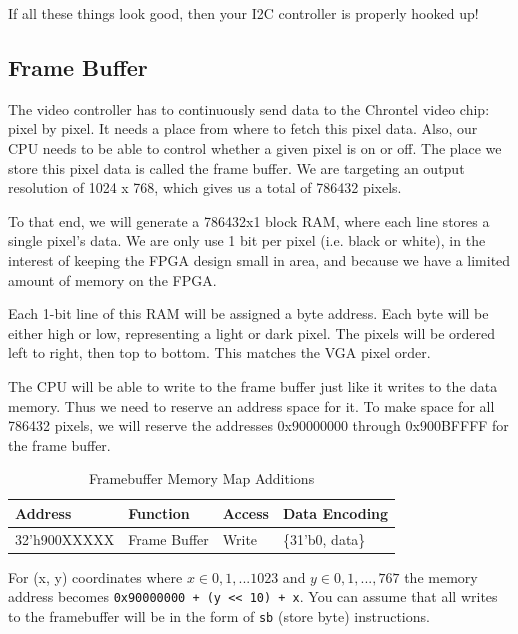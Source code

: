 \documentclass[11pt]{article}
\begin{document}
If all these things look good, then your I2C controller is properly hooked up!

\subsection{Frame Buffer}
The video controller has to continuously send data to the Chrontel video chip: pixel by pixel. It needs a place from where to fetch this pixel data. Also, our CPU needs to be able to control whether a given pixel is on or off. The place we store this pixel data is called the frame buffer. We are targeting an output resolution of 1024 x 768, which gives us a total of 786432 pixels.

To that end, we will generate a 786432x1 block RAM, where each line stores a single pixel's data. We are only use 1 bit per pixel (i.e. black or white), in the interest of keeping the FPGA design small in area, and because we have a limited amount of memory on the FPGA.

Each 1-bit line of this RAM will be assigned a byte address. Each byte will be either high or low, representing a light or dark pixel. The pixels will be ordered left to right, then top to bottom. This matches the VGA pixel order. 

The CPU will be able to write to the frame buffer just like it writes to the data memory. Thus we need to reserve an address space for it. To make space for all 786432 pixels, we will reserve the addresses 0x90000000 through 0x900BFFFF for the frame buffer.

\begin{table}[hbt]
	\begin{center}
		\caption{Framebuffer Memory Map Additions}
		\label{frame_buffer}
		\begin{tabular}{l l l l}
			\toprule
			\textbf{Address} & \textbf{Function} & \textbf{Access} & \textbf{Data Encoding}\\
			\midrule
			32'h900XXXXX & Frame Buffer & Write & \{31'b0, data\} \\
		\end{tabular}
	\end{center}
\end{table}

For (x, y) coordinates where $x \in {0, 1, ... 1023}$ and $y \in {0, 1, ..., 767}$ the memory address becomes \verb|0x90000000 + (y << 10) + x|. You can assume that all writes to the framebuffer will be in the form of \verb|sb| (store byte) instructions.
\end{document}
